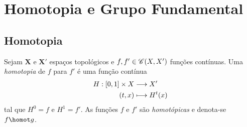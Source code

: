 \cleardoublepage
\section{Homotopia e Grupo Fundamental}

\subsection{Homotopia}

\begin{defi}
Sejam $\bm X$ e $\bm X'$ espaços topológicos e $f,f' \in \mathscr{C}(X,X')$ funções contínuas. Uma \textit{homotopia} de $f$ para $f'$ é uma função contínua
	\begin{align*}
	{H}: {[0,1] \times X} &\longrightarrow {X'} \\{(t,x)} &\longmapsto {H^t(x)}
	\end{align*}
tal que $H^0 = f$ e $H^1 = f'$. As funções $f$ e $f'$ são \textit{homotópicas} e denota-se $f \homot g$.
\end{defi}

